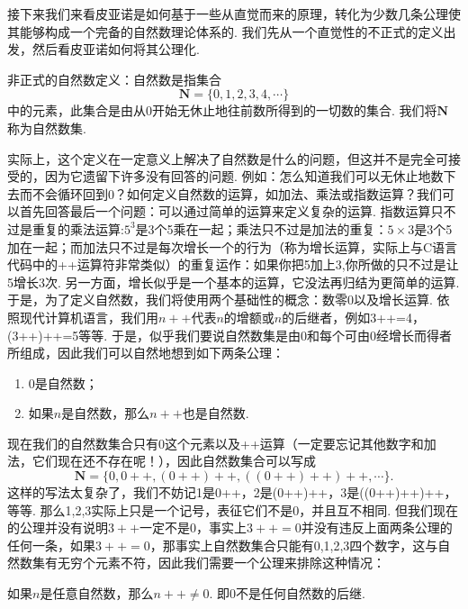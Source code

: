 接下来我们来看皮亚诺是如何基于一些从直觉而来的原理，转化为少数几条公理使其能够构成一个完备的自然数理论体系的. 我们先从一个直觉性的不正式的定义出发，然后看皮亚诺如何将其公理化.

\begin{definition*}
    非正式的自然数定义：自然数是指集合
    \[\mathbf{N}=\{0,1,2,3,4,\cdots\}\]
    中的元素，此集合是由从0开始无休止地往前数所得到的一切数的集合. 我们将$\mathbf{N}$称为自然数集.
\end{definition*}

实际上，这个定义在一定意义上解决了自然数是什么的问题，但这并不是完全可接受的，因为它遗留下许多没有回答的问题. 例如：怎么知道我们可以无休止地数下去而不会循环回到0？如何定义自然数的运算，如加法、乘法或指数运算？我们可以首先回答最后一个问题：可以通过简单的运算来定义复杂的运算. 指数运算只不过是重复的乘法运算:$5^3$是3个5乘在一起；乘法只不过是加法的重复：$5\times 3$是3个5加在一起；而加法只不过是每次增长一个的行为（称为增长运算，实际上与C语言代码中的++运算符非常类似）的重复运作：如果你把5加上3,你所做的只不过是让5增长3次. 另一方面，增长似乎是一个基本的运算，它没法再归结为更简单的运算. 于是，为了定义自然数，我们将使用两个基础性的概念：数零0以及增长运算. 依照现代计算机语言，我们用$n++$代表$n$的增额或$n$的后继者，例如3++=4，(3++)++=5等等. 于是，似乎我们要说自然数集是由0和每个可由0经增长而得者所组成，因此我们可以自然地想到如下两条公理：

\begin{axiom*}
    \begin{enumerate}
        \item 0是自然数；
        \item 如果$n$是自然数，那么$n++$也是自然数.
    \end{enumerate}
\end{axiom*}

现在我们的自然数集合只有0这个元素以及++运算（一定要忘记其他数字和加法，它们现在还不存在呢！），因此自然数集合可以写成
\[\mathbf{N}=\{0,0++,(0++)++,((0++)++)++,\cdots\}.\]
这样的写法太复杂了，我们不妨记1是0++，2是(0++)++，3是((0++)++)++，等等. 那么1,2,3实际上只是一个记号，表征它们不是0，并且互不相同. 但我们现在的公理并没有说明$3++$一定不是0，事实上$3++=0$并没有违反上面两条公理的任何一条，如果$3++=0$，那事实上自然数集合只能有0,1,2,3四个数字，这与自然数集有无穷个元素不符，因此我们需要一个公理来排除这种情况：

\begin{axiom*}
    如果$n$是任意自然数，那么$n++\neq 0$. 即0不是任何自然数的后继.
\end{axiom*}

